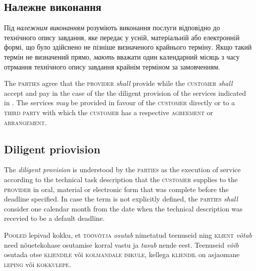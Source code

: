 \begin{Form}
\begin{paracol}{3}
{        \subsection{Належне виконання}
        Під \emph{належним виконанням}  розуміють виконання послуги відповідно до технічного опису завдання, яке  передає  у усній, матеріальній або електронній формі, що було здійснено не пізніше визначеного крайнього терміну. Якщо такий термін не визначений прямо,  \emph{мають} вважати один календарний місяць з часу отрмання технічного опису завдання крайнім терміном за замовченням.
        }
        {The \textsc{parties} agree that the \textsc{provider} \textit{shall} provide while the \textsc{customer} \textit{shall} accept and pay in the case of the the diligent provision of the services indicated in . The services \textit{may} be provided in favour of the \textsc{customer} directly or to a \textsc{third party} with which the \textsc{customer} has a respective \textsc{agreement} or \textsc{arrangement}.

        \subsection{Diligent priovision}
        The \emph{diligent provision} is understood by the \textsc{parties} as the execution of service according to the technical task description that the \textsc{customer} supplies to the \textsc{provider} in oral, material or electronic form that was complete before the deadline specified. In case the term is not explicitly defined, the \textsc{parties} \emph{shall} consider one calendar month from the date when the technical description was recevied to be a default deadline.
        }
        {P\textsc{ooled} lepivad kokku, et \textsc{töövõtja} \emph{osutab}  nimetatud teenuseid ning \textsc{klient} \emph{võtab} need nõuetekohase osutamise korral vastu ja \emph{tasub} nende eest. Teenuseid \emph{võib} osutada otse \textsc{kliendile} või \textsc{kolmandale isikule}, kellega \textsc{kliendil} on asjaomane \textsc{leping} või \textsc{kokkulepe}.

}
\end{paracol}
\end{Form}
